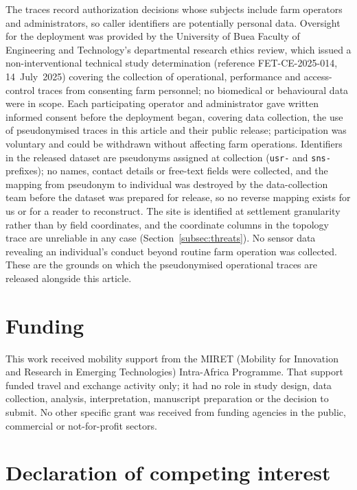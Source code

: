 \documentclass[a4paper,fleqn]{cas-sc}
\begin{document}
The traces record authorization decisions whose subjects include farm
operators and administrators, so caller identifiers are potentially personal
data. Oversight for the deployment was provided by the University of Buea
Faculty of Engineering and Technology's departmental research ethics review,
which issued a non-interventional technical study determination
(reference FET-CE-2025-014, 14~July~2025) covering the collection of
operational, performance and access-control traces from consenting farm
personnel; no biomedical or behavioural data were in scope. Each
participating operator and administrator gave written informed consent before
the deployment began,
covering data collection, the use of pseudonymised traces in this article and
their public release; participation was voluntary and could be withdrawn
without affecting farm operations. Identifiers in the released dataset are
pseudonyms assigned at collection (\texttt{usr-} and \texttt{sns-} prefixes);
no names, contact details or free-text fields were collected, and the
mapping from pseudonym to individual was destroyed by the data-collection
team before the dataset was prepared for release, so no reverse mapping
exists for us or for a reader to reconstruct. The site is identified at
settlement granularity rather than by field coordinates, and the coordinate
columns in the topology trace are unreliable in any case
(Section~\ref{subsec:threats}). No sensor data revealing an individual's
conduct beyond routine farm operation was collected. These are the grounds
on which the pseudonymised operational traces are released alongside this
article.

\section*{Funding}

This work received mobility support from the MIRET (Mobility for
Innovation and Research in Emerging Technologies) Intra-Africa Programme.
That support funded travel and exchange activity only; it had no role in
study design, data collection, analysis, interpretation, manuscript
preparation or the decision to submit. No other specific grant was
received from funding agencies in the public, commercial or
not-for-profit sectors.

\section*{Declaration of competing interest}
\end{document}
